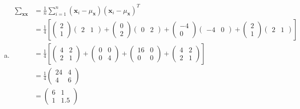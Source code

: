 \documentclass[a4paper,12pt]{article}
\begin{document}
\begin{enumerate}
{\begin{enumerate}[a)]
		\item
		
		\begin{align*}
    			\sum_{\mathbf{xx}} &= \frac{1}{n}\sum_{i=1}^{n}(\mathbf{x}_i - \mu_{\mathbf{x}})(\mathbf{x}_i - \mu_{\mathbf{x}})^T \\
     				&= \frac{1}{4}\left[ \begin{pmatrix} 2 \\ 1 \end{pmatrix}\begin{pmatrix} 2 & 1 \end{pmatrix} + \begin{pmatrix} 0 \\ 2 \end{pmatrix}\begin{pmatrix} 0 & 2 \end{pmatrix} + \begin{pmatrix} -4 \\ 0 \end{pmatrix}\begin{pmatrix} -4 & 0 \end{pmatrix} + \begin{pmatrix} 2 \\ 1 \end{pmatrix}\begin{pmatrix} 2 & 1 \end{pmatrix}\right] \\
     				&= \frac{1}{4}\left[ \begin{pmatrix} 4 & 2 \\ 2 & 1 \end{pmatrix} + \begin{pmatrix} 0 & 0 \\ 0 & 4 \end{pmatrix} + \begin{pmatrix} 16 & 0 \\ 0 & 0 \end{pmatrix} + \begin{pmatrix} 4 & 2 \\ 2 & 1 \end{pmatrix}\right] \\
     				&= \frac{1}{4} \begin{pmatrix} 24 & 4 \\ 4 & 6 \end{pmatrix} \\
     				&= \begin{pmatrix} 6 & 1 \\ 1 & 1.5 \end{pmatrix} \\
		\end{align*}
		



\end{enumerate}}
\end{enumerate}
\end{document}
